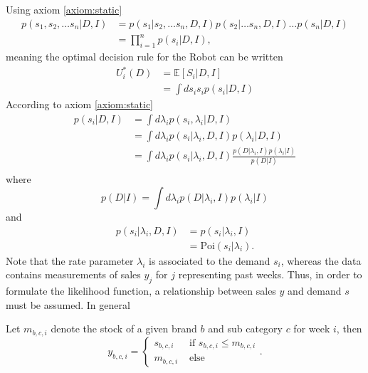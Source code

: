 Using axiom \ref{axiom:static} 
\begin{equation}
	\begin{split}
		p(s_1,s_2,\dots s_n|D,I) &= p(s_1|s_2,\dots s_n,D,I)p(s_2|\dots s_n,D,I)\dots p(s_n|D,I)\\
		& = \prod_{i=1}^np(s_i|D,I),
	\end{split}
\end{equation}
meaning the optimal decision rule for the Robot can be written
\begin{equation}
	\begin{split}
		U_i^*(D) &= \mathbb{E}[S_i|D,I] \\
		& = \int d s_i s_ip(s_i|D,I)
	\end{split}
\end{equation}
According to axiom \ref{axiom:static}
\begin{equation}
	\begin{split}
		p(s_i|D,I)&=\int d\lambda_i p(s_i,\lambda_i|D,I)\\
		&=\int d\lambda_i p(s_i|\lambda_i,D,I)p(\lambda_i|D,I)\\
		&=\int d\lambda_i p(s_i|\lambda_i,D,I)\frac{p(D|\lambda_i,I)p(\lambda_i|I)}{p(D|I)}\\
	\end{split}
\end{equation}
where 
\begin{equation}
	p(D|I) = \int d\lambda_i p(D|\lambda_i,I)p(\lambda_i|I)
\end{equation}
and
\begin{equation}
	\begin{split}
		p(s_i|\lambda_i,D,I) & = p(s_i|\lambda_i,I)\\
		& = \text{Poi}(s_i|\lambda_i).
	\end{split}
\end{equation}
Note that the rate parameter $\lambda_i$ is associated to the demand $s_i$, whereas the data contains measurements of sales $y_j$ for $j$ representing past weeks. Thus, in order to formulate the likelihood function, a relationship between sales $y$ and demand $s$ must be assumed. In general

\begin{definition}
	\label{def:demand_sales}
	Let $m_{b,c,i}$ denote the stock of a given brand $b$ and sub category $c$ for week $i$, then
	\begin{equation}
		y_{b,c,i} = \begin{cases}
			s_{b,c,i} & \text{ if } s_{b,c,i}\leq m_{b,c,i}\\
			m_{b,c,i} & \text{ else }
		\end{cases}.
	\end{equation}
\end{definition}


